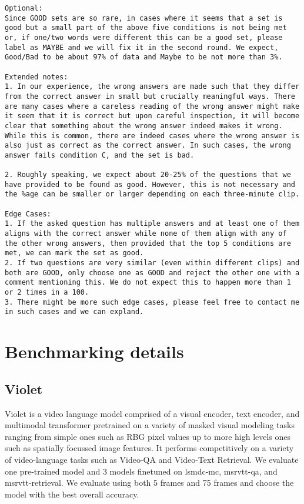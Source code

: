 \begin{lstlisting}
Optional: 
Since GOOD sets are so rare, in cases where it seems that a set is good but a small part of the above five conditions is not being met or, if one/two words were different this can be a good set, please label as MAYBE and we will fix it in the second round. We expect, Good/Bad to be about 97% of data and Maybe to be not more than 3%.

Extended notes:
1. In our experience, the wrong answers are made such that they differ from the correct answer in small but crucially meaningful ways. There are many cases where a careless reading of the wrong answer might make it seem that it is correct but upon careful inspection, it will become clear that something about the wrong answer indeed makes it wrong.  While this is common, there are indeed cases where the wrong answer is also just as correct as the correct answer. In such cases, the wrong answer fails condition C, and the set is bad. 

2. Roughly speaking, we expect about 20-25% of the questions that we have provided to be found as good. However, this is not necessary and the %age can be smaller or larger depending on each three-minute clip. 

Edge Cases: 
1. If the asked question has multiple answers and at least one of them aligns with the correct answer while none of them align with any of the other wrong answers, then provided that the top 5 conditions are met, we can mark the set as good.  
2. If two questions are very similar (even within different clips) and both are GOOD, only choose one as GOOD and reject the other one with a comment mentioning this. We do not expect this to happen more than 1 or 2 times in a 100. 
3. There might be more such edge cases, please feel free to contact me in such cases and we can expland. 
\end{lstlisting}\section{Benchmarking details}
\label{sec:benchmarking_details}
\subsection{\textbf{Violet}}
Violet is a video language model comprised of a visual encoder, text encoder, and multimodal transformer pretrained on a variety of masked visual modeling tasks ranging from simple ones such as RBG pixel values up to more high levels ones such as spatially focussed image features. It performs competitively on a variety of video-language tasks such as Video-QA and Video-Text Retrieval. We evaluate one pre-trained model and 3 models finetuned on lsmdc-mc, msrvtt-qa, and msrvtt-retrieval. We evaluate using both 5 frames and 75 frames and choose the model with the best overall accuracy.
